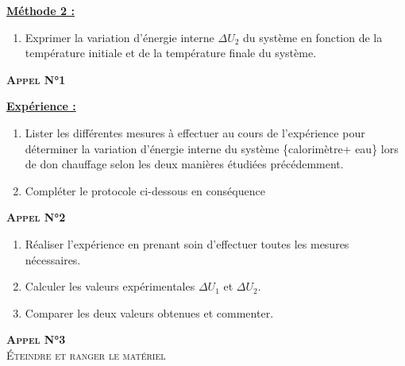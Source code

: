 \documentclass[a4paper,11pt,fleqn]{scrartcl}%
\begin{document}
\textbf{\underline{Méthode 2 : }}
\begin{enumerate}[resume]
	\item Exprimer la variation d'énergie interne $\Delta U_2$ du système en fonction de la température initiale et de la température finale du système.
\end{enumerate}
\begin{center}
	\textsc{\textbf{Appel N°1}}
\end{center}

\textbf{\underline{Expérience : }}
\begin{enumerate}[resume]
	\item Lister les différentes mesures à effectuer au cours de l'expérience pour déterminer la variation d'énergie interne du système \{calorimètre+ eau\} lors de don chauffage selon les deux manières étudiées précédemment.
	\item Compléter le protocole ci-dessous en conséquence
\end{enumerate}
\noindent {}

\begin{center}
	\textsc{\textbf{Appel N°2}}
\end{center}
\begin{enumerate}[resume]
	\item Réaliser l'expérience en prenant soin d'effectuer toutes les mesures nécessaires.
	\item Calculer les valeurs expérimentales $\Delta U_1$ et $\Delta U_2$.
	\item Comparer les deux valeurs obtenues et commenter.
\end{enumerate}

\begin{center}
	\textsc{\textbf{Appel N°3} \\
	Éteindre et ranger le matériel}
	
\end{center}
\end{document}
